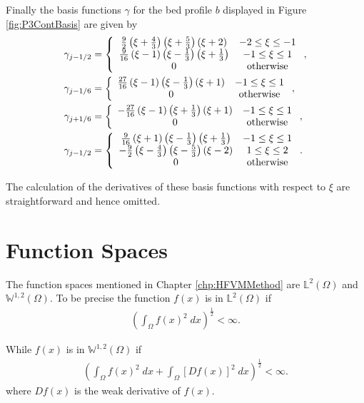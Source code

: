 Finally the basis functions $\gamma$ for the bed profile $b$ displayed in Figure \ref{fig:P3ContBasis} are given by
\begin{align}
\gamma_{j-1/2} &= \left\lbrace \begin{array}{c c}
\frac{9}{2}\left(\xi + \frac{4}{3}\right)\left(\xi + \frac{5}{3}\right)\left(\xi + 2\right) & -2 \le \xi \le -1\\
\frac{9}{16}\left(\xi - 1\right)\left(\xi - \frac{1}{3}\right)\left(\xi  + \frac{1}{3}\right) & -1 \le \xi \le 1\\
0 & \text{otherwise} 
\end{array} \right. ,\\
\gamma_{j-1/6} &= \left\lbrace \begin{array}{c c}
\frac{27}{16}\left(\xi - 1\right)\left(\xi - \frac{1}{3}\right)\left(\xi + 1\right) & -1 \le \xi \le 1\\
0 & \text{otherwise} 
\end{array} \right. ,\\
\gamma_{j+1/6} &= \left\lbrace \begin{array}{c c}
-\frac{27}{16}\left(\xi - 1\right)\left(\xi + \frac{1}{3}\right)\left(\xi + 1\right) & -1 \le \xi \le 1\\
0 & \text{otherwise} 
\end{array} \right. ,\\
\gamma_{j-1/2} &= \left\lbrace \begin{array}{c c}
\frac{9}{16}\left(\xi + 1\right)\left(\xi - \frac{1}{3}\right)\left(\xi  + \frac{1}{3}\right) & -1 \le \xi \le 1\\
-\frac{9}{2}\left(\xi - \frac{4}{3}\right)\left(\xi - \frac{5}{3}\right)\left(\xi - 2\right) & 1 \le \xi \le 2\\
0 & \text{otherwise} 
\end{array} \right. .
\end{align}

The calculation of the derivatives of these basis functions with respect to $\xi$ are straightforward and hence omitted. 

\section{Function Spaces}
The function spaces mentioned in Chapter \ref{chp:HFVMMethod} are $\mathbb{L}^2(\Omega)$ and $\mathbb{W}^{1,2}(\Omega)$. To be precise the function $f(x)$ is in $\mathbb{L}^2(\Omega)$ if
\begin{eqnarray}
\left( \int_{\Omega} f(x)^2 \; dx \right)^{\frac{1}{2}} < \infty.
\end{eqnarray}

While $f(x)$ is in $\mathbb{W}^{1,2}(\Omega)$ if 
\begin{eqnarray}
\left( \int_{\Omega} f(x)^2 \; dx +  \int_{\Omega} \left[D f(x) \right]^2 \; dx  \right)^{\frac{1}{2}} < \infty.
\end{eqnarray}
where $D f(x)$ is the weak derivative of $f(x)$. 
